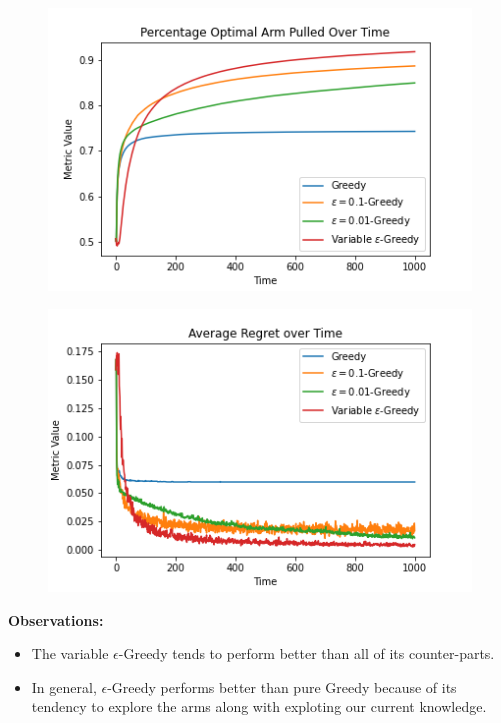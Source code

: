 \documentclass{article}
\begin{document}
		\begin{figure}[H]
		\graphicspath{ {../Experiments/Bernoulli_2_Greedy/} }
		\centering
		\begin{minipage}{.5\textwidth}
		  \centering
		  \includegraphics[width=\linewidth]{Percentage_Optimal_Arm_Pulled_Over_Time.png}
		  \label{fig:test1}
		\end{minipage}%
		\begin{minipage}{.5\textwidth}
		  \centering
		  \includegraphics[width=\linewidth]{Average_Regret_over_Time.png}
		  \label{fig:test2}
		\end{minipage}
		\end{figure}
		
		\textbf{Observations:}
		\begin{itemize}
			\item The variable $\epsilon$-Greedy tends to perform better than all of its counter-parts.
			\item In general, $\epsilon$-Greedy performs better than pure Greedy because of its tendency to explore the arms along with exploting our current 
				knowledge.
		\end{itemize}
		
\end{document}
